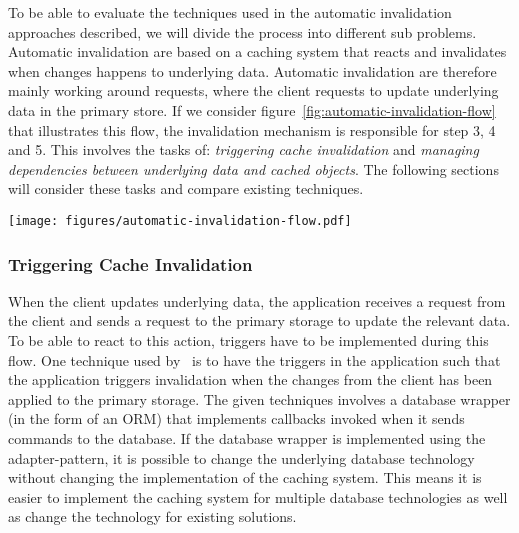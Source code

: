 To be able to evaluate the techniques used in the automatic invalidation approaches described, we will divide the process into different sub problems. Automatic invalidation are based on a caching system that reacts and invalidates when changes happens to underlying data. Automatic invalidation are therefore mainly working around requests, where the client requests to update underlying data in the primary store. If we consider figure~\ref{fig:automatic-invalidation-flow} that illustrates this flow, the invalidation mechanism is responsible for step 3, 4 and 5. This involves the tasks of: \emph{triggering cache invalidation} and \emph{managing dependencies between underlying data and cached objects}. The following sections will consider these tasks and compare existing techniques.

\begin{figure*}[ht!]
  \centering
  \texttt{[image: figures/automatic-invalidation-flow.pdf]}
  \caption{The control flow of automatic invalidation when a client requests to update underlying data}
  \label{fig:automatic-invalidation-flow}
\end{figure*}

\subsubsection{Triggering Cache Invalidation}
\label{subsubsec:triggering-cache-invalidation}

When the client updates underlying data, the application receives a request from the client and sends a request to the primary storage to update the relevant data. To be able to react to this action, triggers have to be implemented during this flow. One technique used by~\cite{paper:cache-genie, paper:deploy-time} is to have the triggers in the application such that the application triggers invalidation when the changes from the client has been applied to the primary storage. The given techniques involves a database wrapper (in the form of an ORM) that implements callbacks invoked when it sends commands to the database. If the database wrapper is implemented using the adapter-pattern, it is possible to change the underlying database technology without changing the implementation of the caching system. This means it is easier to implement the caching system for multiple database technologies as well as change the technology for existing solutions.

